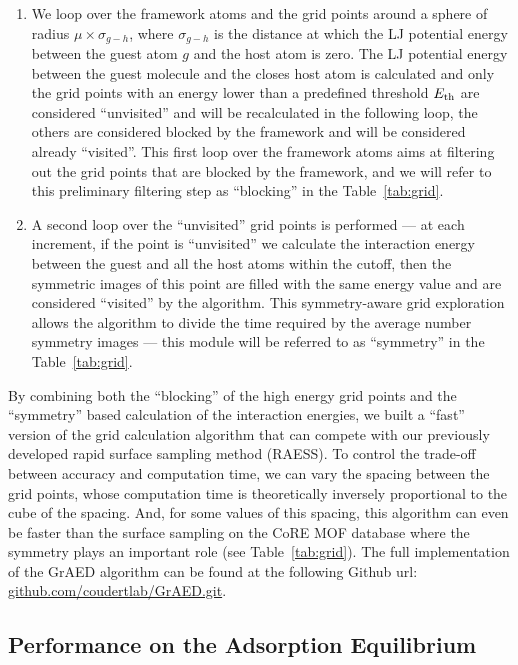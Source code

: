 \documentclass[main]{subfiles}
\begin{document}
\begin{enumerate}
  \item We loop over the framework atoms and the grid points around a sphere of radius $\mu\times\sigma_{g-h}$, where $\sigma_{g-h}$ is the distance at which the LJ potential energy between the guest atom $g$ and the host atom is zero. The LJ potential energy between the guest molecule and the closes host atom is calculated and only the grid points with an energy lower than a predefined threshold $E_{\text{th}}$ are considered ``unvisited'' and will be recalculated in the following loop, the others are considered blocked by the framework and will be considered already ``visited''. This first loop over the framework atoms aims at filtering out the grid points that are blocked by the framework, and we will refer to this preliminary filtering step as ``blocking'' in the Table~\ref{tab:grid}.
  \item A second loop over the ``unvisited'' grid points is performed --- at each increment, if the point is ``unvisited'' we calculate the interaction energy between the guest and all the host atoms within the cutoff, then the symmetric images of this point are filled with the same energy value and are considered ``visited'' by the algorithm. This symmetry-aware grid exploration allows the algorithm to divide the time required by the average number symmetry images --- this module will be referred to as ``symmetry'' in the Table~\ref{tab:grid}.
\end{enumerate}

By combining both the ``blocking'' of the high energy grid points and the ``symmetry'' based calculation of the interaction energies, we built a ``fast'' version of the grid calculation algorithm that can compete with our previously developed rapid surface sampling method (RAESS). To control the trade-off between accuracy and computation time, we can vary the spacing between the grid points, whose computation time is theoretically inversely proportional to the cube of the spacing. And, for some values of this spacing, this algorithm can even be faster than the surface sampling on the CoRE MOF database where the symmetry plays an important role (see Table~\ref{tab:grid}). The full implementation of the GrAED algorithm can be found at the following Github url: \url{github.com/coudertlab/GrAED.git}.

\subsection{Performance on the Adsorption Equilibrium}
\end{document}
